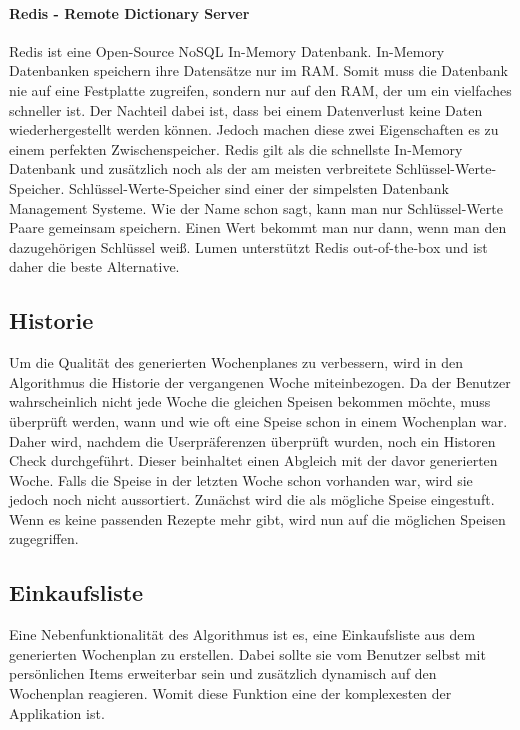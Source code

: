 \paragraph{Redis - Remote Dictionary Server}

Redis\cite{Redis} ist eine Open-Source NoSQL In-Memory\cite{InMemoryDatabase} Datenbank. In-Memory Datenbanken speichern ihre Datensätze nur im RAM. Somit muss die Datenbank nie auf eine Festplatte zugreifen, sondern nur auf den RAM, der um ein vielfaches schneller ist. Der Nachteil dabei ist, dass bei einem Datenverlust keine Daten wiederhergestellt werden können. Jedoch machen diese zwei Eigenschaften es zu einem perfekten Zwischenspeicher. Redis gilt als die schnellste In-Memory Datenbank und zusätzlich noch als der am meisten verbreitete Schlüssel-Werte-Speicher\cite{KeyValueStores}. Schlüssel-Werte-Speicher sind einer der simpelsten Datenbank Management Systeme. Wie der Name schon sagt, kann man nur Schlüssel-Werte Paare gemeinsam speichern. Einen Wert bekommt man nur dann, wenn man den dazugehörigen Schlüssel weiß. Lumen unterstützt Redis out-of-the-box und ist daher die beste Alternative. 

\subsection{Historie}

Um die Qualität des generierten Wochenplanes zu verbessern, wird in den Algorithmus die Historie der vergangenen Woche miteinbezogen. Da der Benutzer wahrscheinlich nicht jede Woche die gleichen Speisen bekommen möchte, muss überprüft werden, wann und wie oft eine Speise schon in einem Wochenplan war. Daher wird, nachdem die Userpräferenzen überprüft wurden, noch ein Historen Check durchgeführt. Dieser beinhaltet einen Abgleich mit der davor generierten Woche. Falls die Speise in der letzten Woche schon vorhanden war, wird sie jedoch noch nicht aussortiert. Zunächst wird die als mögliche Speise eingestuft. Wenn es keine passenden Rezepte mehr gibt, wird nun auf die möglichen Speisen zugegriffen.

\subsection{Einkaufsliste}

Eine Nebenfunktionalität des Algorithmus ist es, eine Einkaufsliste aus dem generierten Wochenplan zu erstellen. Dabei sollte sie vom Benutzer selbst mit persönlichen Items erweiterbar sein und zusätzlich dynamisch auf den Wochenplan reagieren. Womit diese Funktion eine der komplexesten der Applikation ist.

